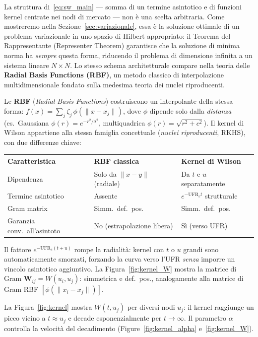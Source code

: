 \documentclass[11pt,a4paper]{article}
\theoremstyle{plain}
\theoremstyle{definition}
\theoremstyle{remark}
\newcommand{\UFR}{\ensuremath{\mathrm{UFR}}}
\newcommand{\Wmat}{\mathbf{W}}
\begin{document}
La struttura di~\eqref{eq:sw_main} --- somma di un termine asintotico e di
funzioni kernel centrate nei nodi di mercato --- non \`e una scelta arbitraria.
Come mostreremo nella Sezione~\ref{sec:variazionale}, essa \`e la soluzione ottimale
di un problema variazionale in uno spazio di Hilbert appropriato: il Teorema del
Rappresentante (Representer Theorem) garantisce che la soluzione di minima norma
ha \emph{sempre} questa forma, riducendo il problema di dimensione infinita a un
sistema lineare $N \times N$.
Lo stesso schema architetturale compare nella teoria delle
\textbf{Radial Basis Functions (RBF)}, un metodo classico di interpolazione
multidimensionale fondato sulla medesima teoria dei nuclei riproducenti.

\begin{keybox}
Le \textbf{RBF} (\emph{Radial Basis Functions}) costruiscono un interpolante della
stessa forma: $f(x) = \sum_j \zeta_j\,\phi(\|x-x_j\|)$, dove $\phi$ dipende
solo dalla \emph{distanza} (es.~Gaussiana $\phi(r)=e^{-r^2/\sigma^2}$, multiquadrica
$\phi(r)=\sqrt{r^2+c^2}$). Il kernel di Wilson appartiene alla stessa famiglia
concettuale (\emph{nuclei riproducenti}, RKHS), con due differenze chiave:
\begin{center}\small
\renewcommand{\arraystretch}{1.2}
\begin{tabular}{lll}
\toprule
\textbf{Caratteristica} & \textbf{RBF classica} & \textbf{Kernel di Wilson}\\
\midrule
Dipendenza & Solo da $\|x-y\|$ (radiale) & Da $t$ e $u$ separatamente\\
Termine asintotico & Assente & $e^{-\UFR_c t}$ strutturale\\
Gram matrix & Simm.\ def.\ pos. & Simm.\ def.\ pos.\\
Garanzia conv.\ all'asintoto & No (estrapolazione libera) & S\`i (verso UFR)\\
\bottomrule
\end{tabular}
\end{center}
Il fattore $e^{-\UFR_c(t+u)}$ rompe la radialit\`a: kernel con $t$ o $u$
grandi sono automaticamente smorzati, forzando la curva verso l'UFR
\emph{senza} imporre un vincolo asintotico aggiuntivo. La Figura~\ref{fig:kernel_W}
mostra la matrice di Gram $\Wmat_{ij}=W(u_i,u_j)$: simmetrica e def.\ pos.,
analogamente alla matrice di Gram RBF $[\phi(\|x_i-x_j\|)]$.
\end{keybox}

La Figura~\ref{fig:kernel} mostra $W(t,u_j)$ per diversi nodi $u_j$: il kernel
raggiunge un picco vicino a $t \approx u_j$ e decade esponenzialmente per
$t\to\infty$. Il parametro $\alpha$ controlla la velocit\`a del decadimento
(Figure~\ref{fig:kernel_alpha} e~\ref{fig:kernel_W}).
\end{document}
